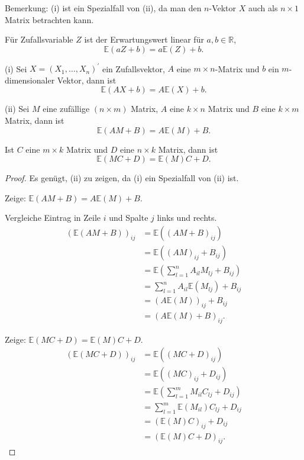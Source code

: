 \documentclass{tstextbook}
\begin{document}
\begin{remark}
	Bemerkung: (i) ist ein Spezialfall von (ii), da man den $n$-Vektor
$X$ auch als $n\times1$ Matrix betrachten kann.
\end{remark}

Für Zufallsvariable $Z$ ist der Erwartungswert linear für $a,b\in\mathbb{R}$,
\[
\mathbb{E}(aZ+b)=a\mathbb{E}(Z)+b.
\]

\begin{theorem}
	\label{th:linearitäterwartungswert}
(i) Sei $X=(X_{1},\ldots,X_{n})^{\prime}$ ein Zufallsvektor, $A$
eine $m\times n$-Matrix und $b$ ein $m$-dimensionaler Vektor, dann
ist 
\[
\mathbb{E}(AX+b)=A\mathbb{E}(X)+b.
\]

(ii) Sei $M$ eine zufällige $(n\times m)$ Matrix,
$A$ eine $k\times n$ Matrix und $B$ eine $k\times m$ Matrix, dann
ist 
\[
\mathbb{E}(AM+B)=A\mathbb{E}(M)+B.
\]

Ist $C$ eine $m\times k$ Matrix und $D$ eine $n\times k$ Matrix,
dann ist 
\[
\mathbb{E}(MC+D)=\mathbb{E}(M)C+D.
\]

\end{theorem}

\begin{proof}
	

Es genügt, (ii) zu zeigen, da (i) ein Spezialfall von (ii) ist. 

Zeige: $\mathbb{E}(AM+B)=A\mathbb{E}(M)+B.$

Vergleiche Eintrag in Zeile $i$ und Spalte $j$ links und rechts.
\begin{align*}
	\left(\mathbb{E}(AM+B)\right)_{ij} & =\mathbb{E}\left((AM+B)_{ij}\right)\\
	& =\mathbb{E}\left((AM)_{ij}+B{}_{ij}\right)\\
	& =\mathbb{E}\left(\sum_{l=1}^{n}A_{il}M{}_{lj}+B{}_{ij}\right)\\
	& =\sum_{l=1}^{n}A_{il}\mathbb{E}\left(M_{lj}\right)+B_{ij}\\
	& =\left(A\mathbb{E}(M)\right)_{ij}+B_{ij}\\
	& =\left(A\mathbb{E}(M)+B\right)_{ij}.
\end{align*}

Zeige: $\mathbb{E}(MC+D)=\mathbb{E}(M)C+D$.
\begin{align*}
	\left(\mathbb{E}(MC+D)\right)_{ij} & =\mathbb{E}\left((MC+D)_{ij}\right)\\
	& =\mathbb{E}\left((MC)_{ij}+D{}_{ij}\right)\\
	& =\mathbb{E}\left(\sum_{l=1}^{m}M_{il}C{}_{lj}+D{}_{ij}\right)\\
	& =\sum_{l=1}^{m}\mathbb{E}\left(M_{il}\right)C_{lj}+D_{ij}\\
	& =\left(\mathbb{E}(M)C\right)_{ij}+D_{ij}\\
	& =\left(\mathbb{E}(M)C+D\right)_{ij}.
\end{align*}

\end{proof}
\end{document}
